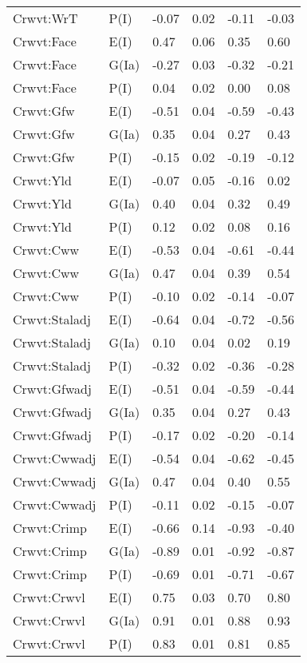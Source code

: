 \begin{center}
\begin{longtable}{|p{1.1in}|p{0.7in}|p{0.7in}|p{0.6in}|p{0.6in}|p{0.6in}|}
  Crwvt:WrT & P(I) & -0.07 & 0.02 & -0.11 & -0.03 \\ 
  Crwvt:Face & E(I) & 0.47 & 0.06 & 0.35 & 0.60 \\ 
  Crwvt:Face & G(Ia) & -0.27 & 0.03 & -0.32 & -0.21 \\ 
  Crwvt:Face & P(I) & 0.04 & 0.02 & 0.00 & 0.08 \\ 
  Crwvt:Gfw & E(I) & -0.51 & 0.04 & -0.59 & -0.43 \\ 
  Crwvt:Gfw & G(Ia) & 0.35 & 0.04 & 0.27 & 0.43 \\ 
  Crwvt:Gfw & P(I) & -0.15 & 0.02 & -0.19 & -0.12 \\ 
  Crwvt:Yld & E(I) & -0.07 & 0.05 & -0.16 & 0.02 \\ 
  Crwvt:Yld & G(Ia) & 0.40 & 0.04 & 0.32 & 0.49 \\ 
  Crwvt:Yld & P(I) & 0.12 & 0.02 & 0.08 & 0.16 \\ 
  Crwvt:Cww & E(I) & -0.53 & 0.04 & -0.61 & -0.44 \\ 
  Crwvt:Cww & G(Ia) & 0.47 & 0.04 & 0.39 & 0.54 \\ 
  Crwvt:Cww & P(I) & -0.10 & 0.02 & -0.14 & -0.07 \\ 
  Crwvt:Staladj & E(I) & -0.64 & 0.04 & -0.72 & -0.56 \\ 
  Crwvt:Staladj & G(Ia) & 0.10 & 0.04 & 0.02 & 0.19 \\ 
  Crwvt:Staladj & P(I) & -0.32 & 0.02 & -0.36 & -0.28 \\ 
  Crwvt:Gfwadj & E(I) & -0.51 & 0.04 & -0.59 & -0.44 \\ 
  Crwvt:Gfwadj & G(Ia) & 0.35 & 0.04 & 0.27 & 0.43 \\ 
  Crwvt:Gfwadj & P(I) & -0.17 & 0.02 & -0.20 & -0.14 \\ 
  Crwvt:Cwwadj & E(I) & -0.54 & 0.04 & -0.62 & -0.45 \\ 
  Crwvt:Cwwadj & G(Ia) & 0.47 & 0.04 & 0.40 & 0.55 \\ 
  Crwvt:Cwwadj & P(I) & -0.11 & 0.02 & -0.15 & -0.07 \\ 
  Crwvt:Crimp & E(I) & -0.66 & 0.14 & -0.93 & -0.40 \\ 
  Crwvt:Crimp & G(Ia) & -0.89 & 0.01 & -0.92 & -0.87 \\ 
  Crwvt:Crimp & P(I) & -0.69 & 0.01 & -0.71 & -0.67 \\ 
  Crwvt:Crwvl & E(I) & 0.75 & 0.03 & 0.70 & 0.80 \\ 
  Crwvt:Crwvl & G(Ia) & 0.91 & 0.01 & 0.88 & 0.93 \\ 
  Crwvt:Crwvl & P(I) & 0.83 & 0.01 & 0.81 & 0.85 \\ 

\end{longtable}
\end{center}
